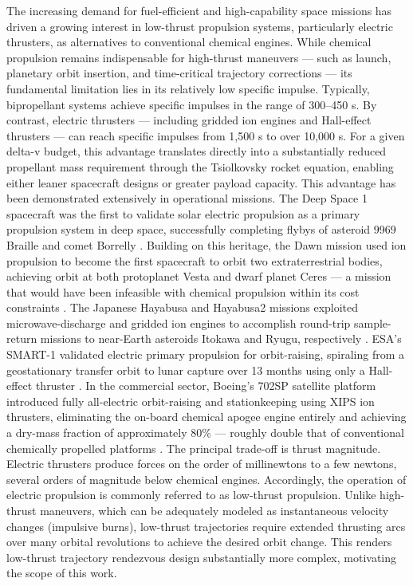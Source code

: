 \documentclass[a4paper,fleqn]{cas-sc}
\begin{document}
The increasing demand for fuel-efficient and high-capability space missions has driven a growing interest in low-thrust propulsion systems, particularly electric thrusters, as alternatives to conventional chemical engines. While chemical propulsion remains indispensable for high-thrust maneuvers — such as launch, planetary orbit insertion, and time-critical trajectory corrections — its fundamental limitation lies in its relatively low specific impulse. Typically, bipropellant systems achieve specific impulses in the range of 300–450 s. By contrast, electric thrusters — including gridded ion engines and Hall-effect thrusters — can reach specific impulses from 1,500 s to over 10,000 s. For a given delta-v budget, this advantage translates directly into a substantially reduced propellant mass requirement through the Tsiolkovsky rocket equation, enabling either leaner spacecraft designs or greater payload capacity. This advantage has been demonstrated extensively in operational missions. The Deep Space 1 spacecraft was the first to validate solar electric propulsion as a primary propulsion system in deep space, successfully completing flybys of asteroid 9969 Braille and comet Borrelly \citet{Rayman2000}. Building on this heritage, the Dawn mission used ion propulsion to become the first spacecraft to orbit two extraterrestrial bodies, achieving orbit at both protoplanet Vesta and dwarf planet Ceres — a mission that would have been infeasible with chemical propulsion within its cost constraints \citet{Brophy2011}. The Japanese Hayabusa and Hayabusa2 missions exploited microwave-discharge and gridded ion engines to accomplish round-trip sample-return missions to near-Earth asteroids Itokawa and Ryugu, respectively \citet{Kuninaka2007, Tsuda2013}. ESA's SMART-1 validated electric primary propulsion for orbit-raising, spiraling from a geostationary transfer orbit to lunar capture over 13 months using only a Hall-effect thruster \citet{Racca2002}. In the commercial sector, Boeing's 702SP satellite platform introduced fully all-electric orbit-raising and stationkeeping using XIPS ion thrusters, eliminating the on-board chemical apogee engine entirely and achieving a dry-mass fraction of approximately 80\% — roughly double that of conventional chemically propelled platforms \citet{Feuerborn2013}. The principal trade-off is thrust magnitude. Electric thrusters produce forces on the order of millinewtons to a few newtons, several orders of magnitude below chemical engines. Accordingly, the operation of electric propulsion is commonly referred to as low-thrust propulsion. Unlike high-thrust maneuvers, which can be adequately modeled as instantaneous velocity changes (impulsive burns), low-thrust trajectories require extended thrusting arcs over many orbital revolutions to achieve the desired orbit change. This renders low-thrust trajectory rendezvous design substantially more complex, motivating the scope of this work.
 
\end{document}
